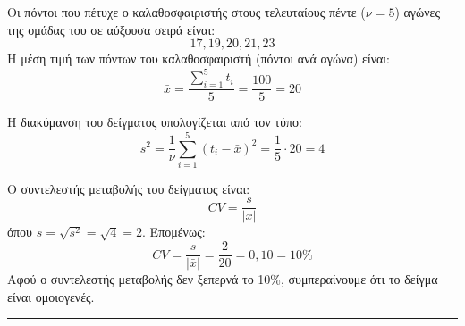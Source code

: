 \begin{alist}
\item Οι πόντοι που πέτυχε ο καλαθοσφαιριστής στους τελευταίους πέντε ($ν = 5$) αγώνες της ομάδας του σε αύξουσα σειρά είναι:
\[
    17, 19, 20, 21, 23
\]
Η μέση τιμή των πόντων του καλαθοσφαιριστή (πόντοι ανά αγώνα) είναι:
\[
    \bar{x} = \frac{\sum_{i=1}^{5} t_i}{5} = \frac{100}{5} = 20
\]

\item Η διακύμανση του δείγματος υπολογίζεται από τον τύπο:
\[
    s^2 = \frac{1}{ν} \sum_{i=1}^{5} (t_i - \bar{x})^2 = \frac{1}{5} \cdot 20 = 4
\]

\item Ο συντελεστής μεταβολής του δείγματος είναι:
\[
    CV = \frac{s}{|\bar{x}|}
\]
όπου $s = \sqrt{s^2} = \sqrt{4} = 2$. Επομένως:
\[
    CV = \frac{s}{|\bar{x}|} = \frac{2}{20} = 0,10 = 10\%
\]
Αφού ο συντελεστής μεταβολής δεν ξεπερνά το 10\%, συμπεραίνουμε ότι το δείγμα είναι ομοιογενές.
\end{alist}
\vspace{6mm}
\noindent\rule{\textwidth}{0.4pt}
\vspace{6mm}

